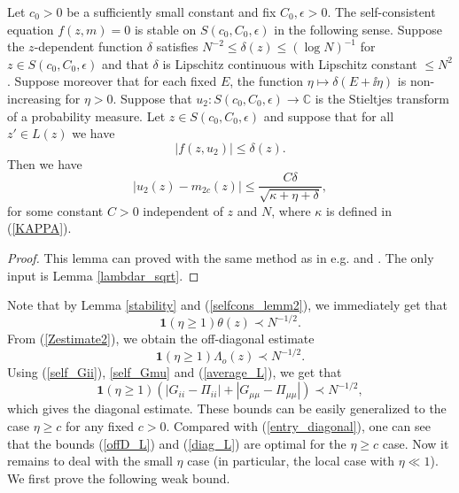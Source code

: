 \begin{lemma}\label{stability}
Let $c_0>0$ be a sufficiently small constant and fix $C_0,\epsilon>0$. The self-consistent equation $f(z,m)=0$ is stable on $S(c_0,C_0, \epsilon)$ in the following sense. Suppose the $z$-dependent function $\delta$ satisfies $N^{-2} \le \delta(z) \le (\log N)^{-1}$ for $z\in S(c_0,C_0, \epsilon)$ and that $\delta$ is Lipschitz continuous with Lipschitz constant $\le N^2$. Suppose moreover that for each fixed $E$, the function $\eta \mapsto \delta(E+\ii\eta)$ is non-increasing for $\eta>0$. Suppose that $u_2: S(c_0,C_0,\epsilon)\to \mathbb C$ is the Stieltjes transform of a probability measure. Let $z\in S(c_0,C_0,\epsilon)$ and suppose that for all $z'\in L(z)$ we have 
\begin{equation}\label{Stability0}
\left| f(z, u_2)\right| \le \delta(z).
\end{equation}
Then we have
\begin{equation}
\left|u_2(z)-m_{2c}(z)\right|\le \frac{C\delta}{\sqrt{\kappa+\eta+\delta}},\label{Stability1}
\end{equation}
for some constant $C>0$ independent of $z$ and $N$, where $\kappa$ is defined in (\ref{KAPPA}). 
\end{lemma}
\begin{proof}
This lemma can proved with the same method as in e.g. \cite[Lemma 4.5]{isotropic} and \cite[Appendix A.2]{Anisotropic}. The only input is Lemma \ref{lambdar_sqrt}. 
\end{proof}


Note that by Lemma \ref{stability} and (\ref{selfcons_lemm2}), we immediately get that
\begin{equation}\label{average_L}
\mathbf 1(\eta\ge 1)\theta(z) \prec N^{-1/2}.
\end{equation}
From (\ref{Zestimate2}), we obtain the off-diagonal estimate
\begin{equation}\label{offD_L}
\mathbf 1(\eta\ge 1)\Lambda_o(z) \prec N^{-1/2}.
\end{equation}
Using (\ref{self_Gii}), \eqref{self_Gmu} and (\ref{average_L}), we get that 
\begin{equation}\label{diag_L}
\mathbf 1(\eta\ge 1)\left(\left|G_{ii} - \Pi_{ii}\right| + |G_{\mu\mu}-\Pi_{\mu\mu}|\right) \prec N^{-1/2},
\end{equation}
which gives the diagonal estimate. These bounds can be easily generalized to the case $\eta \ge c$ for any fixed $c>0$. Compared with (\ref{entry_diagonal}), one can see that the bounds (\ref{offD_L}) and (\ref{diag_L}) are optimal for the $\eta\ge c$ case. Now it remains to deal with the small $\eta$ case (in particular, the local case with $\eta\ll 1$). We first prove the following weak bound.

